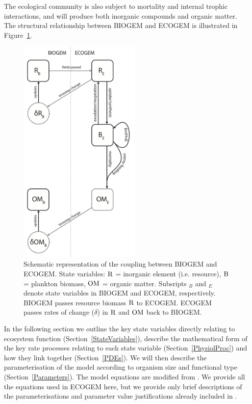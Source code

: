 \documentclass[gmd, manuscript]{copernicus}
\begin{document}
The ecological community is also subject to mortality and internal trophic interactions, and will produce both inorganic compounds and organic matter. The structural relationship between BIOGEM and ECOGEM is illustrated in Figure~\ref{BIOECOGEM}. 

\begin{figure}[htp!]
\includegraphics[width=6cm]{Final_figures/Fig_1.png}
\caption{Schematic representation of the coupling between BIOGEM and ECOGEM. State variables: $\rm{R}$ = inorganic element (i.e. resource),  $\rm{B}$ = plankton biomass, $\rm{OM}$ = organic matter. Subsripts $_B$ and $_E$ denote state variables in BIOGEM and ECOGEM, respectively. BIOGEM passes resource biomass $\rm{R}$ to ECOGEM. ECOGEM passes rates of change ($\delta$) in  $\rm{R}$ and $\rm{OM}$ back to BIOGEM.}
\label{BIOECOGEM}
\end{figure}

In the following section we outline the key state variables directly relating to ecosystem function (Section~\ref{StateVariables}), describe the mathematical form of the key rate processes relating to each state variable (Section~\ref{PhysiolProc}) and how they link together (Section~\ref{PDEs}). We will then describe the parameterisation of the model according to organism size and functional type (Section~\ref{Parameters}). The model equations are modified from \citet{Ward:2012}. We provide all the equations used in ECOGEM here, but we provide only brief descriptions of the parameterisations and parameter value justifications already included in \citet{Ward:2012}.
 
\end{document}
